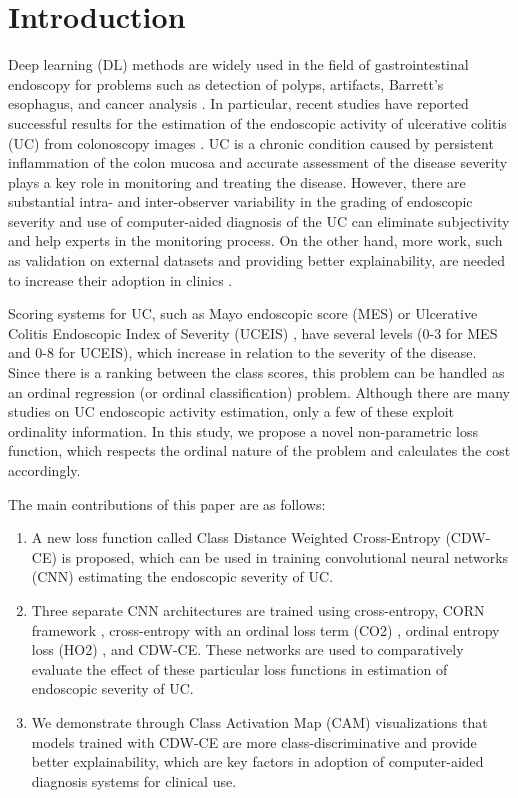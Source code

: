 \documentclass[runningheads]{llncs}
\begin{document}
\section{Introduction}

Deep learning (DL) methods are widely used in the field of gastrointestinal endoscopy for problems such as detection of polyps, artifacts, Barrett's esophagus, and cancer analysis \cite{polat2020endoscopic,ali2021deep,polat2021polyp,ali2022assessing,du2019review}. In particular, recent studies have reported successful results for the estimation of the endoscopic activity of ulcerative colitis (UC) from colonoscopy images  \cite{limdi2021automated,takenaka2022artificial}. UC is a chronic condition caused by persistent inflammation of the colon mucosa and accurate assessment of the disease severity plays a key role in monitoring and treating the disease. However, there are substantial intra- and inter-observer variability in the grading of endoscopic severity \cite{osada2010comparison} and use of computer-aided diagnosis of the UC can eliminate subjectivity and help experts in the monitoring process. On the other hand, more work, such as validation on external datasets and providing better explainability, are needed to increase their adoption in clinics \cite{limdi2021automated}. 

Scoring systems for UC, such as Mayo endoscopic score (MES) \cite{schroeder1987coated} or Ulcerative Colitis Endoscopic Index of Severity (UCEIS) \cite{travis2013reliability}, have several levels (0-3 for MES and 0-8 for UCEIS), which increase in relation to the severity of the disease. Since there is a ranking between the class scores, this problem can be handled as an ordinal regression (or ordinal classification) problem. Although there are many studies on UC endoscopic activity estimation, only a few of these exploit ordinality information. In this study, we propose a novel non-parametric loss function, which respects the ordinal nature of the problem and calculates the cost accordingly.

The main contributions of this paper are as follows:
\begin{enumerate}
\item A new loss function called Class Distance Weighted Cross-Entropy (CDW-CE) is proposed, which can be used in training convolutional neural networks (CNN) estimating the endoscopic severity of UC.  

\item Three separate CNN architectures are trained using cross-entropy, CORN framework \cite{shi2021deep}, cross-entropy with an ordinal loss term (CO2) \cite{albuquerque2021ordinal}, ordinal entropy loss (HO2) \cite{albuquerque2021ordinal}, and CDW-CE. These networks are used to comparatively evaluate the effect of these particular loss functions in estimation of endoscopic severity of UC.

\item We demonstrate through Class Activation Map (CAM) visualizations that models trained with CDW-CE are more class-discriminative and provide better explainability, which are key factors in adoption of computer-aided diagnosis systems for clinical use.
\end{enumerate}
\end{document}
